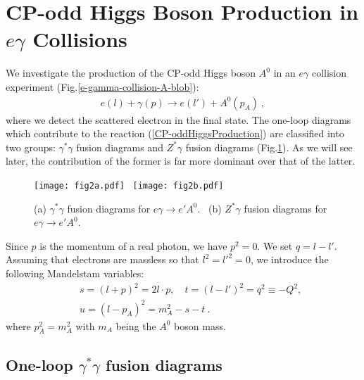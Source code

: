 \documentclass[final,5p,times,twocolumn]{elsarticle}
\newcommand{\bea}{\begin{eqnarray}}
\newcommand{\eea}{\end{eqnarray}}
\begin{document}
\section{CP-odd Higgs Boson Production in $e\gamma$ Collisions}
We 
investigate the production of the CP-odd Higgs boson $A^0$ in an 
$e\gamma$ collision experiment  (Fig.\ref{e-gamma-collision-A-blob}):
\bea
  e(l) +\gamma(p) \rightarrow 
 e(l') +A^0(p_A)~, \label{CP-oddHiggsProduction}
\eea
where we detect the scattered electron in the final state.
The one-loop diagrams which contribute to the reaction
 (\ref{CP-oddHiggsProduction}) 
are classified into two groups:  $\gamma^*\gamma$ fusion diagrams and $Z^*\gamma$ fusion diagrams (Fig.\ref{ggandZgfusion}).
As we will see later, the contribution of the 
former is far more dominant over that of the latter.

\begin{figure}[hbt]
\begin{center}
\texttt{[image: fig2a.pdf]}
\
\texttt{[image: fig2b.pdf]}
\caption{\label{ggandZgfusion} 
(a) $\gamma^*\gamma$ fusion diagrams for $e \gamma\rightarrow e'A^0$. 
\ (b) $Z^*\gamma$ fusion diagrams for $e \gamma\rightarrow e'A^0$.} 
\end{center}
\end{figure}
Since
$p$ is the momentum of a real photon,  we have $p^2=0$.  We set 
$q=l-l'$. Assuming that electrons are massless so that $l^2={l'}^2=0$, 
we introduce the following Mandelstam variables:
\bea
&&s=(l+p)^2=2l\cdot p,\quad t=(l-l')^2=q^2\equiv-Q^2,\\
&&u=(l-p_A)^2=m_A^2-s-t~.
\eea
where $p_A^2=m_A^2$ with $m_A$ being the 
$A^0$ boson mass.

\subsection{One-loop $\gamma^*\gamma$ fusion diagrams}
\end{document}
